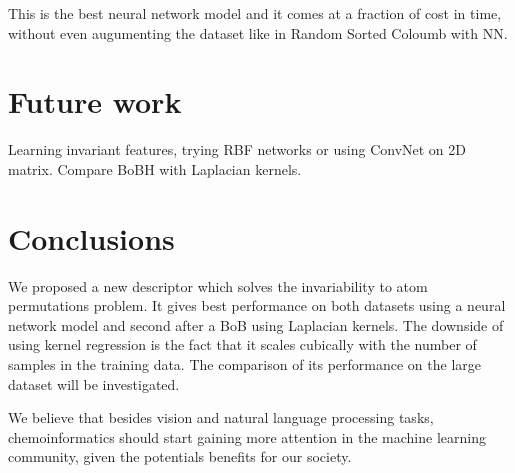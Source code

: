 \documentclass{article}
\begin{document}
This is the best neural network model and it comes at a fraction of cost in time, without even augumenting the dataset like in Random Sorted Coloumb with NN.

\section{Future work}
Learning invariant features, trying RBF networks or using ConvNet on 2D matrix.
Compare BoBH with Laplacian kernels.

\section{Conclusions}
We proposed a new descriptor which solves the invariability to atom permutations problem. It gives best performance on both datasets using a neural network model and second after a BoB using Laplacian kernels. The downside of using kernel regression is the fact that it scales cubically with the number of samples in the training data. 
The comparison of its performance on the large dataset will be investigated.

We believe that besides vision and natural language processing tasks, chemoinformatics  should start gaining more attention  in the machine learning community, given the potentials benefits for our society.





\end{document}
